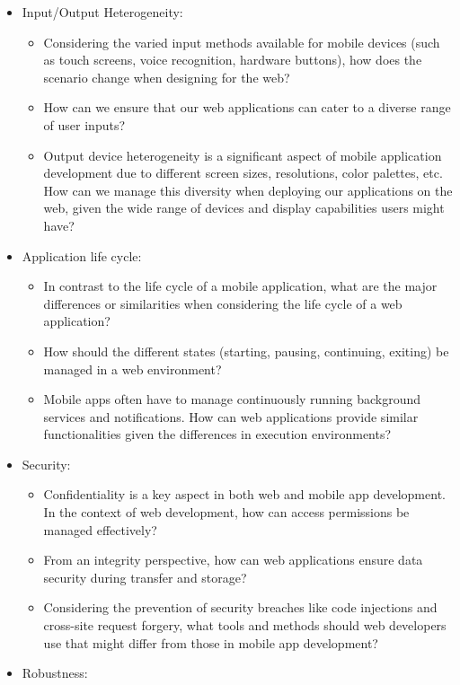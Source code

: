 \begin{itemize}
\begin{itemize}
    \end{itemize}
  \item Input/Output Heterogeneity:
    \begin{itemize}
      \item Considering the varied input methods available for mobile devices (such as touch screens, voice recognition, hardware buttons), how does the scenario change when designing for the web?
      \item How can we ensure that our web applications can cater to a diverse range of user inputs?
      \item Output device heterogeneity is a significant aspect of mobile application development due to different screen sizes, resolutions, color palettes, etc. How can we manage this diversity when deploying our applications on the web, given the wide range of devices and display capabilities users might have?
    \end{itemize}
  \item Application life cycle:
    \begin{itemize}
      \item In contrast to the life cycle of a mobile application, what are the major differences or similarities when considering the life cycle of a web application?
      \item How should the different states (starting, pausing, continuing, exiting) be managed in a web environment?
      \item Mobile apps often have to manage continuously running background services and notifications. How can web applications provide similar functionalities given the differences in execution environments?
    \end{itemize}
  \item Security:
    \begin{itemize}
      \item Confidentiality is a key aspect in both web and mobile app development. In the context of web development, how can access permissions be managed effectively?
      \item From an integrity perspective, how can web applications ensure data security during transfer and storage?
      \item Considering the prevention of security breaches like code injections and cross-site request forgery, what tools and methods should web developers use that might differ from those in mobile app development?
    \end{itemize}
  \item Robustness:

\end{itemize}
